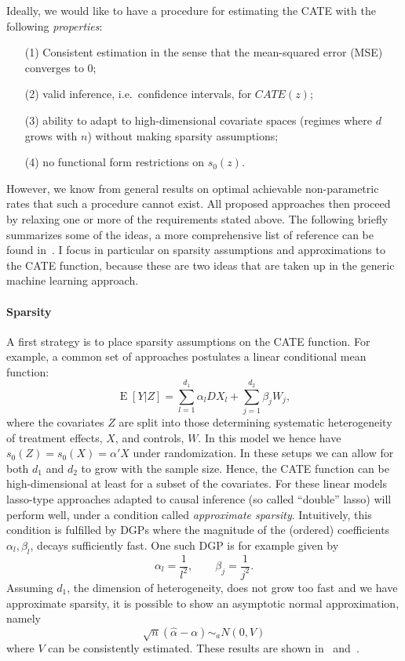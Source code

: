 \documentclass[11pt, a4paper, leqno]{article}
\DeclareMathOperator{\E}{E}
\begin{document}
Ideally, we would like to have a procedure for estimating the CATE with the following \textit{properties}:
\begin{itemize}
    \item[(1)] Consistent estimation in the sense that the mean-squared error (MSE) converges to 0;
    \item[(2)] valid inference, i.e.\ confidence intervals, for $CATE(z)$;
    \item[(3)] ability to adapt to high-dimensional covariate spaces (regimes where $d$ grows with $n$) without making sparsity assumptions;
    \item[(4)] no functional form restrictions on $s_0(z)$.
\end{itemize}
However, we know from general results on optimal achievable non-parametric rates that such a procedure cannot exist.
All proposed approaches then proceed by relaxing one or more of the requirements stated above. The following briefly summarizes some of the ideas, a more comprehensive list of reference can be found in~\citet{causalml2024}.
I focus in particular on sparsity assumptions and approximations to the CATE function, because these are two ideas that are taken up in the generic machine learning approach.
\paragraph*{Sparsity}
A first strategy is to place sparsity assumptions on the CATE function.
For example, a common set of approaches postulates a linear conditional mean function:
\begin{equation*}
    \E[Y|Z] = \sum_{l=1}^{d_1}\alpha_l DX_l + \sum_{j=1}^{d_2}\beta_j W_j,
\end{equation*}
where the covariates $Z$ are split into those determining systematic heterogeneity of treatment effects, $X$, and controls, $W$.
In this model we hence have $s_0(Z) = s_0(X) = \alpha'X$ under randomization. In these setups we can allow for both $d_1$ and $d_2$ to grow with the sample size.
Hence, the CATE function can be high-dimensional at least for a subset of the covariates.
For these linear models lasso-type approaches adapted to causal inference (so called ``double'' lasso) will perform well, under a condition called \textit{approximate sparsity}.
Intuitively, this condition is fulfilled by DGPs where the magnitude of the (ordered) coefficients $\alpha_l, \beta_l$, decays sufficiently fast.
One such DGP is for example given by
\begin{equation*}
    \alpha_l = \frac{1}{l^2}, \qquad \beta_j = \frac{1}{j^2}.
\end{equation*}
Assuming $d_1$, the dimension of heterogeneity, does not grow too fast and we have approximate sparsity, it is possible to show an asymptotic normal approximation, namely
\begin{equation*}
    \sqrt{n}(\hat{\alpha}-\alpha) \sim_a N(0,V)
\end{equation*}
where $V$ can be consistently estimated. These results are shown in~\citet{belloni2015uniform} and~\citet{belloni2018uniformly}.
\end{document}
